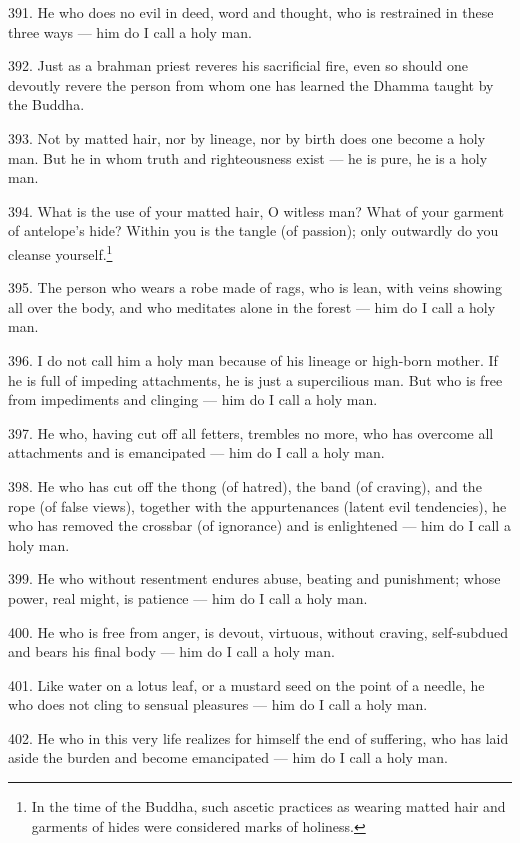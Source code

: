391. He who does no evil in deed, word and thought, who is restrained in these three ways — him do I call a holy man.

392. Just as a brahman priest reveres his sacrificial fire, even so should one devoutly revere the person from whom one has learned the Dhamma taught by the Buddha.

393. Not by matted hair, nor by lineage, nor by birth does one become a holy man. But he in whom truth and righteousness exist — he is pure, he is a holy man.

394. What is the use of your matted hair, O witless man? What of your garment of antelope's hide? Within you is the tangle (of passion); only outwardly do you cleanse yourself.\footnote{In the time of the Buddha, such ascetic practices as wearing matted hair and garments of hides were considered marks of holiness.}

395. The person who wears a robe made of rags, who is lean, with veins showing all over the body, and who meditates alone in the forest — him do I call a holy man.

396. I do not call him a holy man because of his lineage or high-born mother. If he is full of impeding attachments, he is just a supercilious man. But who is free from impediments and clinging — him do I call a holy man.

397. He who, having cut off all fetters, trembles no more, who has overcome all attachments and is emancipated — him do I call a holy man.

398. He who has cut off the thong (of hatred), the band (of craving), and the rope (of false views), together with the appurtenances (latent evil tendencies), he who has removed the crossbar (of ignorance) and is enlightened — him do I call a holy man.

399. He who without resentment endures abuse, beating and punishment; whose power, real might, is patience — him do I call a holy man.

400. He who is free from anger, is devout, virtuous, without craving, self-subdued and bears his final body — him do I call a holy man.

401. Like water on a lotus leaf, or a mustard seed on the point of a needle, he who does not cling to sensual pleasures — him do I call a holy man.

402. He who in this very life realizes for himself the end of suffering, who has laid aside the burden and become emancipated — him do I call a holy man.

